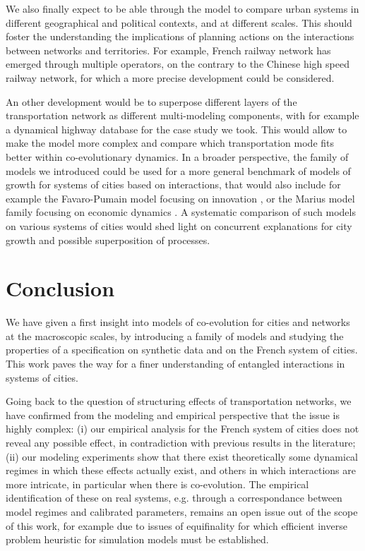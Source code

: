 \documentclass[11pt]{article}
\begin{document}
We also finally expect to be able through the model to compare urban systems in different geographical and political contexts, and at different scales. This should foster the understanding the implications of planning actions on the interactions between networks and territories. For example, French railway network has emerged through multiple operators, on the contrary to the Chinese high speed railway network, for which a more precise development could be considered.


An other development would be to superpose different layers of the transportation network as different multi-modeling components, with for example a dynamical highway database for the case study we took. This would allow to make the model more complex and compare which transportation mode fits better within co-evolutionary dynamics. In a broader perspective, the family of models we introduced could be used for a more general benchmark of models of growth for systems of cities based on interactions, that would also include for example the Favaro-Pumain model focusing on innovation \citep{favaro2011gibrat}, or the Marius model family focusing on economic dynamics \citep{cottineau2014evolution}. A systematic comparison of such models on various systems of cities would shed light on concurrent explanations for city growth and possible superposition of processes.


\section*{Conclusion}

We have given a first insight into models of co-evolution for cities and networks at the macroscopic scales, by introducing a family of models and studying the properties of a specification on synthetic data and on the French system of cities. This work paves the way for a finer understanding of entangled interactions in systems of cities.

Going back to the question of structuring effects of transportation networks, we have confirmed from the modeling and empirical perspective that the issue is highly complex: (i) our empirical analysis for the French system of cities does not reveal any possible effect, in contradiction with previous results in the literature; (ii) our modeling experiments show that there exist theoretically some dynamical regimes in which these effects actually exist, and others in which interactions are more intricate, in particular when there is co-evolution. The empirical identification of these on real systems, e.g. through a correspondance between model regimes and calibrated parameters, remains an open issue out of the scope of this work, for example due to issues of equifinality for which efficient inverse problem heuristic for simulation models must be established.
\end{document}

